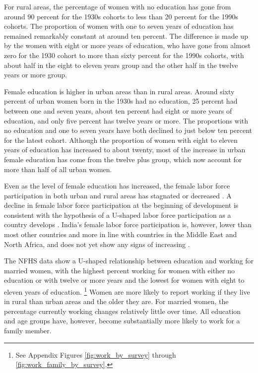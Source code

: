 \documentclass[12pt,letterpaper]{article}
\begin{document}
For rural areas, the percentage of women with no education has gone from around 90 percent
for the 1930s cohorts to less than 20 percent for the 1990s cohorts. 
The proportion of women with one to seven years of education has remained remarkably
constant at around ten percent.
The difference is made up by the women with eight or more years of education, who have
gone from almost zero for the 1930 cohort to more than sixty percent for the 1990s cohorts,
with about half in the eight to eleven years group and 
the other half in the twelve years or more group.

Female education is higher in urban areas than in rural areas.
Around sixty percent of urban women born in the 1930s had no education, 25 percent had
between one and seven years, about ten percent had eight or more years of education, and 
only five percent has twelve years or more.
The proportions with no education and one to seven years have both declined to just below 
ten percent for the latest cohort.
Although the proportion of women with eight to eleven years of education has increased
to about twenty, most of the increase in urban female education has come from the 
twelve plus group, which now account for more than half of all urban women.

Even as the level of female education has increased, the female labor force participation 
in both urban and rural areas has stagnated or decreased
\citep{Klasen2015,Fletcher2017,Afridi2018,Bhargava2018,Chatterjee2018,Bhargava2019}.
A decline in female labor force participation at the beginning of development is
consistent with the hypothesis of a U-shaped labor force participation as a country
develops \citep{Goldin1994}.
India's female labor force participation is, however, lower than most other
countries and more in line with countries in the Middle East and North Africa, and
does not yet show any signs of increasing
\citep{Klasen2015,Chatterjee2018}.

The NFHS data show a U-shaped relationship between education and working for married
women, with the highest percent working for women with either no education 
or with twelve or more years and the lowest for women with eight to eleven years of 
education.%
\footnote{
See Appendix Figures \ref{fig:work_by_survey} through \ref{fig:work_family_by_survey}. 
}
Women are more likely to report working if they live in rural than urban areas 
and the older they are.
For married women, the percentage currently working changes relatively little over time. 
All education and age groups have, however, become substantially more likely to work for 
a family member.
\end{document}
